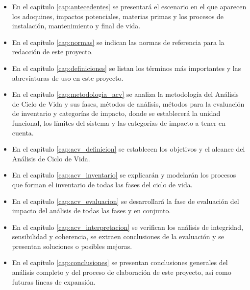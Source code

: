 \begin{itemize}
  \item En el capítulo \ref{cap:antecedentes} se presentará el escenario en el que aparecen los adoquines, impactos potenciales, materias primas y los procesos de instalación, mantenimiento y final de vida.
  \item En el capítulo \ref{cap:normas} se indican las normas de referencia para la redacción de este proyecto.
  \item En el capítulo \ref{cap:definiciones} se listan los términos más importantes y las abreviaturas de uso en este proyecto.
  \item En el capítulo \ref{cap:metodologia_acv} se analiza la metodología del Análisis de Ciclo de Vida y sus fases, métodos de análisis, métodos para la evaluación de inventario y categorías de impacto, donde se establecerá la unidad funcional, los límites del sistema y las categorías de impacto a tener en cuenta.
  \item En el capítulo \ref{cap:acv_definicion} se establecen los objetivos y el alcance del Análisis de Ciclo de Vida.
  \item En el capítulo \ref{cap:acv_inventario} se explicarán y modelarán los procesos que forman el inventario de todas las fases del ciclo de vida.
  \item En el capítulo \ref{cap:acv_evaluacion} se desarrollará la fase de evaluación del impacto del análisis de todas las fases y en conjunto.
  \item En el capítulo \ref{cap:acv_interpretacion} se verifican los análisis de integridad, sensibilidad y coherencia, se extraen conclusiones de la evaluación y se presentan soluciones o posibles mejoras.
  \item En el capítulo \ref{cap:conclusiones} se presentan conclusiones generales del análisis completo y del proceso de elaboración de este proyecto, así como futuras líneas de expansión.
\end{itemize}

